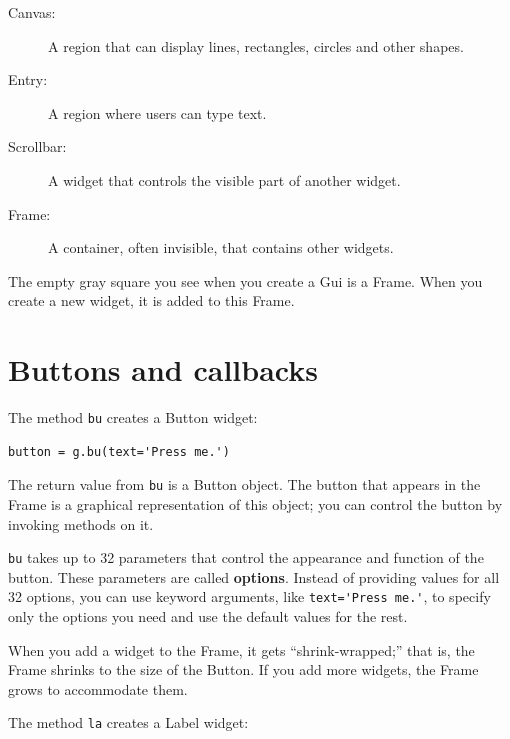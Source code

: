 \documentclass[10pt]{book}
\begin{document}
{\begin{description}
\item[Canvas:] A region that can display lines, rectangles,
circles and other shapes.

\item[Entry:] A region where users can type text.

\item[Scrollbar:] A widget that controls the visible part of another
widget.

\item[Frame:] A container, often invisible, that contains other
widgets.

\end{description}

The empty gray square you see when you create a Gui is
a Frame.  When you create a new widget, it is added to this Frame.



\section{Buttons and callbacks}


The method {\tt bu} creates a Button widget:

\beforeverb
\begin{verbatim}
button = g.bu(text='Press me.')
\end{verbatim}
\afterverb
%
The return value from {\tt bu} is a Button object.  The button
that appears in the Frame is a graphical representation of this
object; you can control the button by invoking methods on it.


{\tt bu} takes up to 32 parameters that control the appearance
and function of the button.  These parameters are called
{\bf options}.  Instead of providing values for all 32 options,
you can use keyword arguments, like \verb"text='Press me.'",
to specify only the options you need and use the default
values for the rest.


When you add a widget to the Frame, it gets ``shrink-wrapped;''
that is, the Frame shrinks to the size of the Button.  If you
add more widgets, the Frame grows to accommodate them.


The method {\tt la} creates a Label widget:

}
\end{document}
